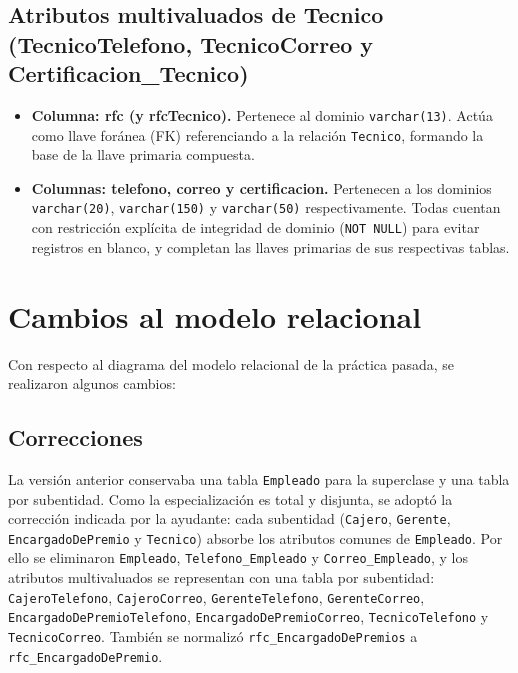 \documentclass[11pt,letterpaper,spanish]{article}
\begin{document}
\subsection*{Atributos multivaluados de Tecnico (TecnicoTelefono, TecnicoCorreo y Certificacion\_Tecnico)}
\begin{itemize}
	\item \textbf{Columna: rfc (y rfcTecnico).} Pertenece al dominio \texttt{varchar(13)}. Actúa como llave foránea (FK) referenciando a la relación \texttt{Tecnico}, formando la base de la llave primaria compuesta.
	\item \textbf{Columnas: telefono, correo y certificacion.} Pertenecen a los dominios \texttt{varchar(20)}, \texttt{varchar(150)} y \texttt{varchar(50)} respectivamente. Todas cuentan con restricción explícita de integridad de dominio (\texttt{NOT NULL}) para evitar registros en blanco, y completan las llaves primarias de sus respectivas tablas.
\end{itemize}


\section*{Cambios al modelo relacional}

Con respecto al diagrama del modelo relacional de la práctica pasada, se realizaron algunos cambios:

\subsection*{Correcciones}
La versión anterior conservaba una tabla \texttt{Empleado} para la superclase y una tabla por subentidad.
Como la especialización es total y disjunta, se adoptó la corrección indicada por la ayudante: cada subentidad (\texttt{Cajero}, \texttt{Gerente}, \texttt{EncargadoDePremio} y \texttt{Tecnico}) absorbe los atributos comunes de \texttt{Empleado}.
Por ello se eliminaron \texttt{Empleado}, \texttt{Telefono\_Empleado} y \texttt{Correo\_Empleado}, y los atributos multivaluados se representan con una tabla por subentidad: \texttt{CajeroTelefono}, \texttt{CajeroCorreo}, \texttt{GerenteTelefono}, \texttt{GerenteCorreo}, \texttt{EncargadoDePremioTelefono}, \texttt{EncargadoDePremioCorreo}, \texttt{TecnicoTelefono} y \texttt{TecnicoCorreo}. También se normalizó \texttt{rfc\_EncargadoDePremios} a \texttt{rfc\_EncargadoDePremio}.
\end{document}
